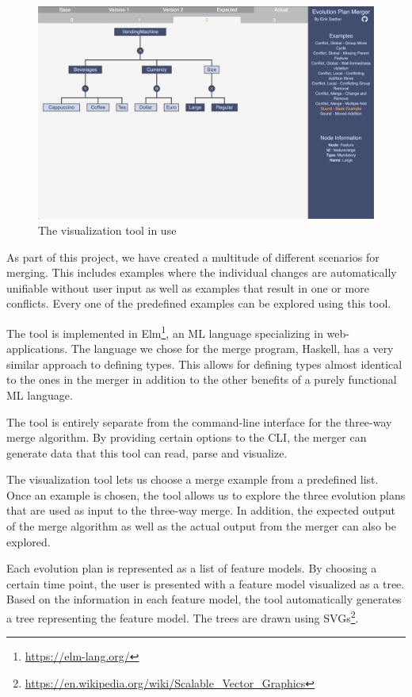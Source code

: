 \documentclass[a4paper,english]{ifimaster}
\begin{document}
\begin{figure}[htpb]
  \centering
  \includegraphics[width=\linewidth]{vending_machine/sound_example.png}
  \caption{The visualization tool in use}%
  \label{fig:visualization_tool_in_use}
\end{figure}

As part of this project, we have created a multitude of different scenarios for merging. This includes examples where the individual changes are automatically unifiable without user input as well as examples that result in one or more conflicts. Every one of the predefined examples can be explored using this tool. 

The tool is implemented in Elm\footnote{\url{https://elm-lang.org/}}, an ML language specializing in web-applications. The language we chose for the merge program, Haskell, has a very similar approach to defining types. This allows for defining types almost identical to the ones in the merger in addition to the other benefits of a purely functional ML language.

The tool is entirely separate from the command-line interface for the three-way merge algorithm. By providing certain options to the CLI, the merger can generate data that this tool can read, parse and visualize.

The visualization tool lets us choose a merge example from a predefined list. Once an example is chosen, the tool allows us to explore the three evolution plans that are used as input to the three-way merge. In addition, the expected output of the merge algorithm as well as the actual output from the merger can also be explored.

Each evolution plan is represented as a list of feature models. By choosing a certain time point, the user is presented with a feature model visualized as a tree. Based on the information in each feature model, the tool automatically generates a tree representing the feature model. The trees are drawn using SVGs\footnote{\url{https://en.wikipedia.org/wiki/Scalable\_Vector\_Graphics}}.
\end{document}
